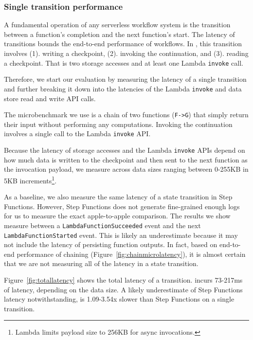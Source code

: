 
\subsubsection{Single transition performance}

A fundamental operation of any serverless workflow system is the transition
between a function's completion and the next function's start. The latency
of transitions bounds the end-to-end performance of workflows. In \name{},
this transition involves (1). writing a checkpoint, (2). invoking the
continuation, and (3). reading a checkpoint. That is two storage accesses and
at least one Lambda \texttt{invoke} call.

Therefore, we start our evaluation by measuring the latency of a single
transition and further breaking it down into the latencies of the Lambda
\texttt{invoke} and data store read and write API calls.

The microbenchmark we use is a chain of two functions (\texttt{F->G}) that
simply return their input without performing any computations. Invoking the
continuation involves a single call to the Lambda \texttt{invoke} API.

Because the latency of storage accesses and the Lambda \texttt{invoke} APIs
depend on how much data is written to the checkpoint and then sent to the next
function as the invocation payload, we measure across data sizes ranging
between 0-255KB in 5KB increments\footnote{Lambda limits payload size to 256KB
for async invocations.}.

As a baseline, we also measure the same latency of a state transition in Step
Functions. However, Step Functions does not generate fine-grained enough logs
for us to measure the exact apple-to-apple comparison. The results we show
measure between a \texttt{LambdaFunctionSucceeded} event and the next
\texttt{LambdaFunctionStarted} event. This is likely an underestimate because
it may not include the latency of persisting function outputs. In fact, based
on end-to-end performance of chaining (Figure~\ref{fig:chainmicrolatency}), it
is almost certain that we are not measuring all of the latency in a state
transition.

Figure~\ref{fig:totallatency} shows the total latency of a transition. \name{}
incurs 73-217ms of latency, depending on the data size. A likely underestimate
of Step Functions latency notwithstanding, \name{} is 1.09-3.54x slower than
Step Functions on a single transition. 

